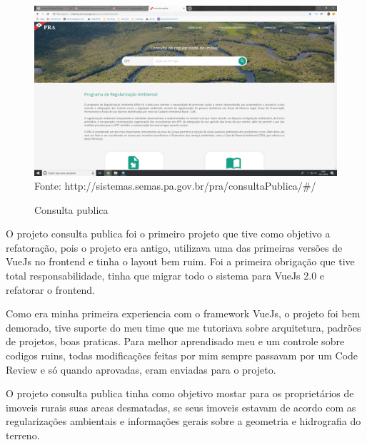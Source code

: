 \begin{figure}[H]
\centering
\caption{Consulta publica} %
\includegraphics[scale=0.22]{consulta-publica}\\  %
{\small Fonte: http://sistemas.semas.pa.gov.br/pra/consultaPublica/#/} %
\label{fig:exemplo} %
\end{figure}

O projeto consulta publica foi o primeiro projeto que tive como objetivo a refatoração, pois o projeto era antigo, utilizava uma das primeiras versões de VueJs no frontend e tinha o layout bem ruim.
Foi a primeira obrigação que tive total responsabilidade, tinha que migrar todo o sistema para VueJs 2.0 e refatorar o frontend.

Como era minha primeira experiencia com o framework VueJs, o projeto foi bem demorado, tive suporte do meu time que me tutoriava sobre arquitetura, padrões de projetos, boas praticas.
Para melhor aprendisado meu e um controle sobre codigos ruins, todas modificações feitas por mim sempre passavam por um Code Review e só quando aprovadas, eram enviadas para o projeto. 

O projeto consulta publica tinha como objetivo mostar para os proprietários de imoveis rurais suas areas desmatadas, se seus imoveis estavam de acordo com as regularizações ambientais e informações gerais sobre a geometria e hidrografia do terreno.


